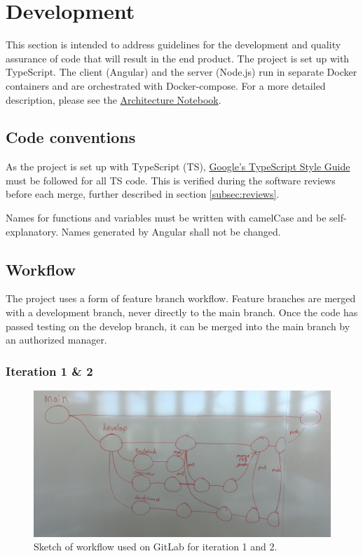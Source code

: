 \section{Development}
This section is intended to address guidelines for the development and quality assurance of code that will result in the end product. The project is set up with TypeScript. The client (Angular) and the server (Node.js) run in separate Docker containers and are orchestrated with Docker-compose. For a more detailed description, please see the \href{https://gitlab.liu.se/tddc88-company-1-2021/deploy/-/tree/main/documents/Architecture\%20Notebook}{Architecture Notebook}.

\subsection{Code conventions}
As the project is set up with TypeScript (TS), \href{https://google.github.io/styleguide/tsguide.html}{Google's TypeScript Style Guide} must be followed for all TS code. This is verified during the software reviews before each merge, further described in section \ref{subsec:reviews}.

Names for functions and variables must be written with camelCase and be self-explanatory. Names generated by Angular shall not be changed.

\subsection{Workflow}
The project uses a form of feature branch workflow. Feature branches are merged with a development branch, never directly to the main branch. Once the code has passed testing on the develop branch, it can be merged into the main branch by an authorized manager.

\subsubsection*{Iteration 1 \& 2}

\begin{figure}[H]
    \centering\includegraphics[width=1\linewidth]{figures/workflow-sketch.jpg}
    \caption{Sketch of workflow used on GitLab for iteration 1 and 2.}
    \label{fig:workflow}
\end{figure}

